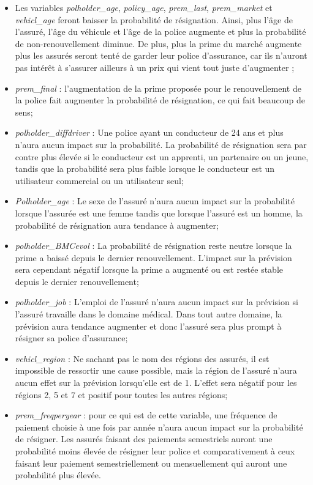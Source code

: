 \documentclass[]{article}
\begin{document}
\begin{itemize}
\item
  Les variables \emph{polholder\_age}, \emph{policy\_age},
  \emph{prem\_last}, \emph{prem\_market} et \emph{vehicl\_age} feront
  baisser la probabilité de résignation. Ainsi, plus l'âge de l'assuré,
  l'âge du véhicule et l'âge de la police augmente et plus la
  probabilité de non-renouvellement diminue. De plus, plus la prime du
  marché augmente plus les assurés seront tenté de garder leur police
  d'assurance, car ils n'auront pas intérêt à s'assurer ailleurs à un
  prix qui vient tout juste d'augmenter ;
\item
  \emph{prem\_final} : l'augmentation de la prime proposée pour le
  renouvellement de la police fait augmenter la probabilité de
  résignation, ce qui fait beaucoup de sens;
\item
  \emph{polholder\_diffdriver} : Une police ayant un conducteur de 24
  ans et plus n'aura aucun impact sur la probabilité. La probabilité de
  résignation sera par contre plus élevée si le conducteur est un
  apprenti, un partenaire ou un jeune, tandis que la probabilité sera
  plus faible lorsque le conducteur est un utilisateur commercial ou un
  utilisateur seul;
\item
  \emph{Polholder\_age} : Le sexe de l'assuré n'aura aucun impact sur la
  probabilité lorsque l'assurée est une femme tandis que lorsque
  l'assuré est un homme, la probabilité de résignation aura tendance à
  augmenter;
\item
  \emph{polholder\_BMCevol} : La probabilité de résignation reste neutre
  lorsque la prime a baissé depuis le dernier renouvellement. L'impact
  sur la prévision sera cependant négatif lorsque la prime a augmenté ou
  est restée stable depuis le dernier renouvellement;
\item
  \emph{polholder\_job} : L'emploi de l'assuré n'aura aucun impact sur
  la prévision si l'assuré travaille dans le domaine médical. Dans tout
  autre domaine, la prévision aura tendance augmenter et donc l'assuré
  sera plus prompt à résigner sa police d'assurance;
\item
  \emph{vehicl\_region} : Ne sachant pas le nom des régions des assurés,
  il est impossible de ressortir une cause possible, mais la région de
  l'assuré n'aura aucun effet sur la prévision lorsqu'elle est de 1.
  L'effet sera négatif pour les régions 2, 5 et 7 et positif pour toutes
  les autres régions;
\item
  \emph{prem\_freqperyear} : pour ce qui est de cette variable, une
  fréquence de paiement choisie à une fois par année n'aura aucun impact
  sur la probabilité de résigner. Les assurés faisant des paiements
  semestriels auront une probabilité moins élevée de résigner leur
  police et comparativement à ceux faisant leur paiement
  semestriellement ou mensuellement qui auront une probabilité plus
  élevée.
\end{itemize}
\end{document}
